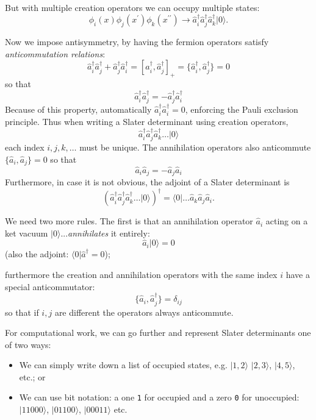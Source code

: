 But with multiple creation operators we can occupy multiple states:
\[
\phi_i(x) \phi_j(x^\prime) \phi_k(x^{\prime \prime}) 
\rightarrow \hat{a}^\dagger_i \hat{a}^\dagger_j \hat{a}^\dagger_k |0 \rangle.
\]

Now we impose antisymmetry, by having the fermion operators satisfy 
\textit{anticommutation relations}:
\[
\hat{a}^\dagger_i \hat{a}^\dagger_j + \hat{a}^\dagger_j \hat{a}^\dagger_i
= [ \hat{a}^\dagger_i ,\hat{a}^\dagger_j ]_+ 
= \{ \hat{a}^\dagger_i ,\hat{a}^\dagger_j \} = 0
\]
so that 
\[
\hat{a}^\dagger_i \hat{a}^\dagger_j = - \hat{a}^\dagger_j \hat{a}^\dagger_i
\]
Because of this property, automatically $\hat{a}^\dagger_i \hat{a}^\dagger_i = 0$, 
enforcing the Pauli exclusion principle.  Thus when writing a Slater determinant 
using creation operators, 
\[
\hat{a}^\dagger_i \hat{a}^\dagger_j \hat{a}^\dagger_k \ldots |0 \rangle
\]
each index $i,j,k, \ldots$ must be unique.
The annihilation operators also anticommute $\{ \hat{a}_i, \hat{a}_j \} = 0$ so that
\[
\hat{a}_i \hat{a}_j = - \hat{a}_j \hat{a}_i
\]
Furthermore, in case it is not obvious, the adjoint of a Slater determinant is 
\[
\left(\hat{a}^\dagger_i \hat{a}^\dagger_j \hat{a}^\dagger_k \ldots |0 \rangle\right)^\dagger
= \langle 0 | \ldots \hat{a}_k \hat{a}_j \hat{a}_i.
\]

We need two more rules. The first is that an annihilation operator 
$\hat{a}_i$ acting on a ket vacuum $| 0 \rangle$...\textit{annihilates} it entirely:
\[
\hat{a}_i | 0 \rangle = 0
\]
(also the adjoint: $\langle 0 | \hat{a}^\dagger  = 0$); 
\smallskip

furthermore the creation and annihilation operators with the same index $i$ have a 
special anticommutator:
\[
\{ \hat{a}_i , \hat{a}^\dagger_j \} = \delta_{ij}
\]
so that if $i,j$ are different the operators always anticommute.

For computational work, we can go further and represent Slater determinants one of 
two ways:

\begin{itemize}

\item We can simply write down a list of occupied states, e.g. $ | 1,2 \rangle$
$ | 2,3 \rangle$, $| 4, 5 \rangle$, etc.; or

\item We can use bit notation: a one {\tt 1} for occupied and a zero {\tt 0} 
for unoccupied: $| 11000 \rangle$, $|01100 \rangle$, $| 00011 \rangle$ etc. 
\end{itemize}

